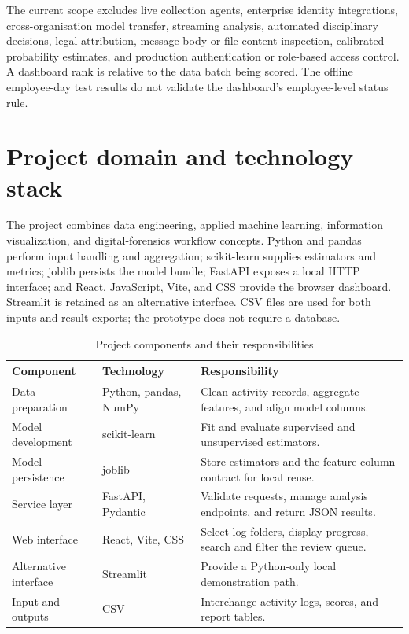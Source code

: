 The current scope excludes live collection agents, enterprise identity
integrations, cross-organisation model transfer, streaming analysis,
automated disciplinary decisions, legal attribution, message-body or
file-content inspection, calibrated probability estimates, and
production authentication or role-based access control. A dashboard
rank is relative to the data batch being scored. The offline
employee-day test results do not validate the dashboard's
employee-level status rule.

\section{Project domain and technology stack}
The project combines data engineering, applied machine learning,
information visualization, and digital-forensics workflow concepts.
Python and pandas perform input handling and aggregation;
scikit-learn supplies estimators and metrics; joblib persists the
model bundle; FastAPI exposes a local HTTP interface; and React,
JavaScript, Vite, and CSS provide the browser dashboard. Streamlit is
retained as an alternative interface. CSV files are used for both
inputs and result exports; the prototype does not require a database.

\begin{table}[H]
\centering
\tablefont
\caption{Project components and their responsibilities}
\label{tab:technology-stack}
\begin{tabularx}{\textwidth}{|p{}|p{}|Y|}
\hline
\textbf{Component} & \textbf{Technology} & \textbf{Responsibility}\\\hline
Data preparation & Python, pandas, NumPy & Clean activity records, aggregate features, and align model columns.\\\hline
Model development & scikit-learn & Fit and evaluate supervised and unsupervised estimators.\\\hline
Model persistence & joblib & Store estimators and the feature-column contract for local reuse.\\\hline
Service layer & FastAPI, Pydantic & Validate requests, manage analysis endpoints, and return JSON results.\\\hline
Web interface & React, Vite, CSS & Select log folders, display progress, search and filter the review queue.\\\hline
Alternative interface & Streamlit & Provide a Python-only local demonstration path.\\\hline
Input and outputs & CSV & Interchange activity logs, scores, and report tables.\\\hline
\end{tabularx}
\end{table}

